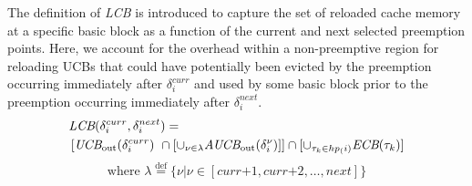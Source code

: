 The definition of \textit{LCB} is introduced to capture the set of reloaded cache memory at a specific basic block as a function of the current and next selected preemption points.  Here, we account for the overhead within a non-preemptive region for reloading UCBs that could have potentially been evicted by the preemption occurring immediately after $\delta_i^{curr}$ and used by some basic block prior to the preemption occurring immediately after $\delta_i^{next}$.
\begin{equation}\label{eqn:lcb-formula-1}
\begin{split}
    \lefteqn{\textit{LCB}(\delta_{i}^{curr},\delta_{i}^{next}) =} & \\
    &\left[\textit{UCB}_{\textrm{out}}(\delta_{i}^{curr})\ \cap \left[\cup_{\nu \in \lambda} \textit{AUCB}_{\textrm{out}}(\delta_{i}^{\nu})\right]\right] \cap [\cup_{\tau_{k}\in hp_(i)} \textit{ECB}(\tau_{k})]\\
\end{split}
\end{equation}
\begin{equation*}\label{eqn:lcb-formula-1b}
    \textrm{where }\lambda \stackrel{\text{def}}{=} \{ \nu|\nu \in [ \textit{curr+1}, \textit{curr+2}, \ldots, \textit{next} ] \}
\end{equation*}
%
\noindent
